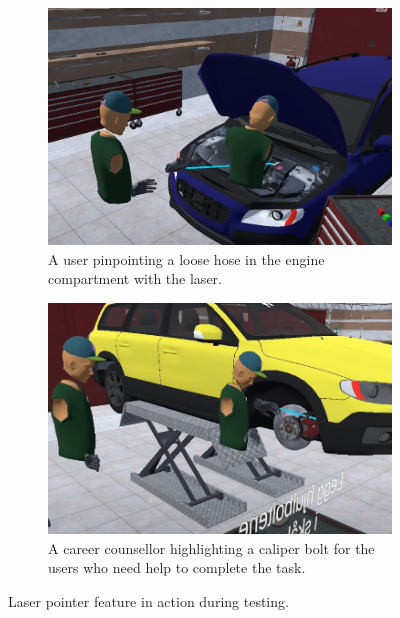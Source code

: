 \begin{figure}[]
  \centering
  \begin{subfigure}[b]{0.45\textwidth}
    \includegraphics[width=1\textwidth]{fig/phase_2/implementation/laser1.png}
    \caption{A user pinpointing a loose hose in the engine compartment with the laser.}
    \label{fig:laser1}
  \end{subfigure}
    \hfill%
  \begin{subfigure}[b]{0.45\textwidth}
    \includegraphics[width=1\textwidth]{fig/phase_2/implementation/laser2.PNG}
    \caption{A career counsellor highlighting a caliper bolt for the users who need help to complete the task.}
    \label{fig:laser2}
  \end{subfigure}
  \hfill%
  \caption{Laser pointer feature in action during testing.}
  \label{fig:phase2Laser}
\end{figure}


